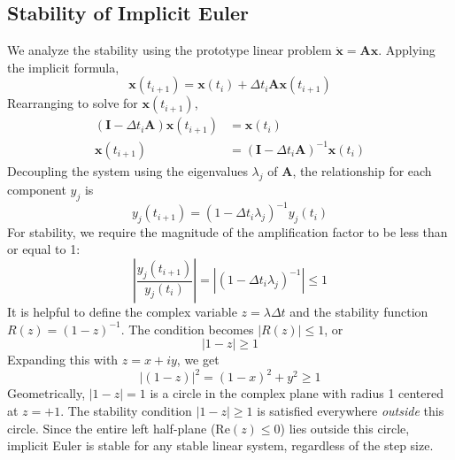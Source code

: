 \subsection{Stability of Implicit Euler}
We analyze the stability using the prototype linear problem $\dot{\mathbf{x}} = \mathbf{A}\mathbf{x}$. Applying the implicit formula,
\begin{equation}
    \mathbf{x}(t_{i+1}) = \mathbf{x}(t_i) + \Delta t_i \mathbf{A} \mathbf{x}(t_{i+1})
\end{equation}
Rearranging to solve for $\mathbf{x}(t_{i+1})$,
\begin{align}
    (\mathbf{I} - \Delta t_i \mathbf{A}) \mathbf{x}(t_{i+1}) &= \mathbf{x}(t_i) \\
    \mathbf{x}(t_{i+1}) &= (\mathbf{I} - \Delta t_i \mathbf{A})^{-1} \mathbf{x}(t_i)
\end{align}
Decoupling the system using the eigenvalues $\lambda_j$ of $\mathbf{A}$, the relationship for each component $y_j$ is
\begin{equation}
    y_j(t_{i+1}) = (1 - \Delta t_i \lambda_j)^{-1} y_j(t_i)
\end{equation}
For stability, we require the magnitude of the amplification factor to be less than or equal to 1:
\begin{equation}
    \left| \frac{y_j(t_{i+1})}{y_j(t_i)} \right| = \left| (1 - \Delta t_i \lambda_j)^{-1} \right| \le 1
\end{equation}
It is helpful to define the complex variable $z = \lambda \Delta t$ and the stability function $R(z) = (1-z)^{-1}$. The condition becomes $|R(z)| \le 1$, or
\begin{equation}
    |1 - z| \ge 1
\end{equation}
Expanding this with $z = x + iy$, we get
\begin{equation}
    |(1 - z)|^2 = (1 - x)^2 + y^2 \ge 1
\end{equation}
Geometrically, $|1-z|=1$ is a circle in the complex plane with radius 1 centered at $z=+1$. The stability condition $|1-z| \ge 1$ is satisfied everywhere \textit{outside} this circle.
Since the entire left half-plane ($\text{Re}(z) \le 0$) lies outside this circle, implicit Euler is stable for any stable linear system, regardless of the step size.

